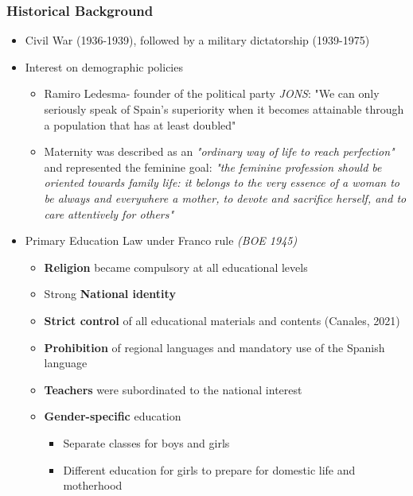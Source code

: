 \documentclass[aspectratio=169]{beamer}
\begin{document}
\begin{frame}
\frametitle{Historical Background}
\begin{itemize}
\item Civil War (1936-1939), followed by a military dictatorship (1939-1975)
\item Interest on demographic policies
\begin{itemize}
    \item {\tiny {\color{gray}Ramiro Ledesma- founder of the political party \textit{JONS}: "We can only seriously speak of Spain's superiority when it becomes attainable through a population that has at least doubled"}}

    \item {\tiny {\color{gray}Maternity was described as an \textit{"ordinary way of life to reach perfection"} and represented the feminine goal: \textit{"the feminine profession should be oriented towards family life: it belongs to the very essence of a woman to be always and everywhere a mother, to devote and sacrifice herself, and to care attentively for others"} }}
\end{itemize}
\item Primary Education Law under Franco rule \textit{(BOE 1945)}
    \begin{itemize}
    \item \textbf{Religion} became compulsory at all educational levels
    \item Strong \textbf{National identity}
    \item \textbf{Strict control} of all educational materials and contents (Canales, 2021)
    \item  \textbf{Prohibition} of regional languages and mandatory use of the Spanish language
    \item \textbf{Teachers} were subordinated to the national interest
    \item \textbf{Gender-specific} education
    \begin{itemize}
    \item Separate classes for boys and girls
     
     \item Different education for girls to prepare for domestic life and motherhood
\end{itemize}
     \end{itemize}
\end{itemize}
\end{frame}

\end{document}
